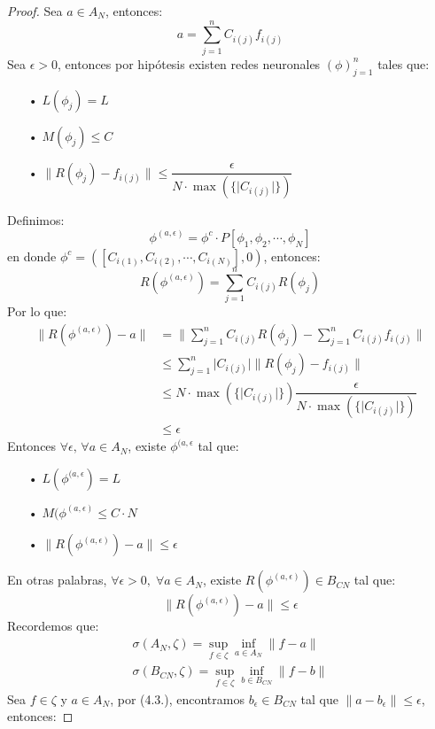 \documentclass[12pt,a4paper]{book}
\providecommand{\abs}[1]{\lvert#1\rvert}
\providecommand{\norm}[1]{\lVert#1\rVert}
\providecommand{\conj}[1]{\lbrace#1\rbrace}
\begin{document}
\begin{proof}
Sea $a\in A_{N}$, entonces: $$a=\sum_{j=1}^{n}C_{i(j)}f_{i(j)}$$
Sea $\epsilon >0$, entonces por hipótesis existen redes neuronales $(\phi)_{j=1}^{n}$ tales que:
\begin{enumerate}
\item[•] $L(\phi_{j})=L$
\item[•] $M(\phi_{j})\leq C$
\item[•] $\norm{R(\phi_{j})-f_{i(j)}}\leq \dfrac{\epsilon}{N\cdot\max(\conj{\abs{C_{i(j)}}})}$
\end{enumerate}
Definimos: $$\phi^{(a,\epsilon)}=\phi^{c}\cdot P[\phi_{1},\phi_{2},\cdots,\phi_{N}]$$
en donde $\phi^{c}=([C_{i(1)},C_{i(2)},\cdots,C_{i(N)}],0)$, entonces: $$R(\phi^{(a,\epsilon)})=\sum_{j=1}^{n}C_{i(j)}R(\phi_{j})$$
Por lo que:
\begin{equation*}
\begin{split}
\norm{R(\phi^{(a,\epsilon)})-a} &= \norm{\sum_{j=1}^{n}C_{i(j)}R(\phi_{j})-\sum_{j=1}^{n}C_{i(j)}f_{i(j)}}\\&
\leq  \sum_{j=1}^{n}\abs{C_{i(j)}}\norm{R(\phi_{j})-f_{i(j)}}\\&
\leq N\cdot\max(\conj{\abs{C_{i(j)}}})\dfrac{\epsilon}{N\cdot\max(\conj{\abs{C_{i(j)}}})}\\&
\leq\epsilon
\end{split}
\end{equation*}
Entonces $\forall\epsilon,\,\forall a\in A_{N}$, existe $\phi^{(a,\epsilon}$ tal que:
\begin{enumerate}
\item[•] $L(\phi^{(a,\epsilon})=L$
\item[•] $M(\phi^{(a,\epsilon)}\leq C\cdot N$
\item[•] $\norm{R(\phi^{(a,\epsilon)})-a}\leq\epsilon$
\end{enumerate}
En otras palabras, $\forall\epsilon >0,\;\forall a\in A_{N}$, existe $R(\phi^{(a,\epsilon)})\in B_{CN}$ tal que:
\begin{equation}
\norm{R(\phi^{(a,\epsilon)})-a}\leq\epsilon
\end{equation}
Recordemos que:
\begin{equation*}
\begin{split}
\sigma(A_{N},\zeta)=\sup_{f\in\zeta}\inf_{a\in A_{N}}\norm{f-a}\\
\sigma(B_{CN},\zeta)=\sup_{f\in\zeta}\inf_{b\in B_{CN}}\norm{f-b}
\end{split}
\end{equation*}
Sea $f\in\zeta$ y $a\in A_{N}$, por (4.3.), encontramos $b_{\epsilon}\in B_{CN}$ tal que $\norm{a-b_{\epsilon}}\leq \epsilon$, entonces:

\end{proof}
\end{document}
